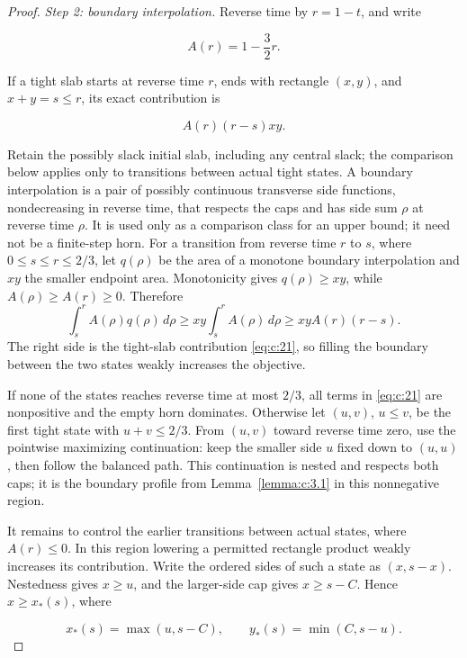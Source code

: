 \begin{proof}
\smallskip\noindent\emph{Step 2: boundary interpolation.}
Reverse time by \(r=1-t\), and write

\[
A(r)=1-\frac32r.
\]

If a tight slab starts at reverse time \(r\), ends with rectangle \((x,y)\),
and \(x+y=s\le r\), its exact contribution is

\begin{equation}
A(r)(r-s)xy.
\label{eq:c:21}
\end{equation}

Retain the possibly slack initial slab, including any central slack;
the comparison below applies only to transitions between actual tight
states. A boundary interpolation is a pair of possibly continuous transverse
side functions, nondecreasing in reverse time, that respects the caps and
has side sum \(\rho\) at reverse time \(\rho\). It is used only as a
comparison class for an upper bound; it need not be a finite-step horn.
For a transition from reverse time \(r\) to \(s\), where
\(0\le s\le r\le2/3\), let \(q(\rho)\) be the area of a monotone boundary
interpolation and \(xy\) the smaller endpoint area. Monotonicity gives
\(q(\rho)\ge xy\), while \(A(\rho)\ge A(r)\ge0\). Therefore
\[
\int_s^r A(\rho)q(\rho)\,d\rho
\ge xy\int_s^r A(\rho)\,d\rho
\ge xyA(r)(r-s).
\]
The right side is the tight-slab contribution \eqref{eq:c:21}, so filling
the boundary between the two states weakly increases the objective.

If none
of the states reaches reverse time at most \(2/3\), all terms in \eqref{eq:c:21} are
nonpositive and the empty horn dominates. Otherwise let \((u,v)\), \(u\le v\),
be the first tight state with \(u+v\le2/3\).
From \((u,v)\) toward reverse time zero, use the pointwise maximizing
continuation: keep the smaller side \(u\) fixed down to \((u,u)\), then
follow the balanced path. This continuation is nested and respects both
caps; it is the boundary profile from Lemma~\ref{lemma:c:3.1} in this
nonnegative region.

It remains to control the earlier transitions between actual states, where
\(A(r)\le0\). In this region lowering a permitted rectangle product weakly
increases its contribution. Write the ordered sides of such a state as
\((x,s-x)\). Nestedness gives \(x\ge u\), and the larger-side cap gives
\(x\ge s-C\). Hence \(x\ge x_*(s)\), where

\begin{equation}
x_*(s)=\max(u,s-C),\qquad
y_*(s)=\min(C,s-u).
\label{eq:c:22}
\end{equation}


\end{proof}

